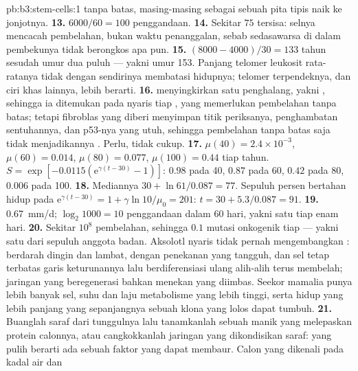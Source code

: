 \begin{solution}{pb:b3:stem-cells:1}
tanpa batas, masing-masing sebagai sebuah pita tipis naik ke jonjotnya.
\textbf{13.} $6000/60 = 100$ penggandaan.
\textbf{14.} Sekitar $75$ tersisa: selnya mencacah pembelahan, bukan waktu
penanggalan, sebab sedasawarsa di dalam pembekunya tidak berongkos apa pun.
\textbf{15.} $(8000 - 4000)/30 = 133$ tahun sesudah umur dua puluh --- yakni umur 153.
Panjang telomer leukosit rata-ratanya tidak dengan sendirinya membatasi hidupnya;
telomer terpendeknya, dan ciri khas lainnya, lebih berarti.
\textbf{16.}  menyingkirkan satu penghalang, yakni ,
sehingga ia ditemukan pada nyaris tiap , yang memerlukan pembelahan
tanpa batas; tetapi fibroblas yang diberi  menyimpan titik periksanya,
penghambatan sentuhannya, dan p53-nya yang utuh, sehingga pembelahan tanpa batas saja tidak
menjadikannya . Perlu, tidak cukup.
\textbf{17.} $\mu(40) = 2.4\times 10^{-3}$, $\mu(60) = 0.014$, $\mu(80) =
0.077$, $\mu(100) = 0.44$ tiap tahun. $S = \exp[-0.0115(\mathrm{e}^{\gamma
(t-30)} - 1)]$: $0.98$ pada 40, $0.87$ pada 60, $0.42$ pada 80, $0.006$ pada
100.
\textbf{18.} Mediannya $30 + \ln 61/0.087 = 77$. Sepuluh persen bertahan hidup pada
$\mathrm{e}^{\gamma(t-30)} = 1 + \gamma\ln 10/\mu_{0} = 201$: $t = 30 +
5.3/0.087 = 91$.
\textbf{19.} \qty{0.67}{mm/d}; $\log_{2}1000 = 10$ penggandaan dalam 60
hari, yakni satu tiap enam hari.
\textbf{20.} Sekitar $10^{8}$ pembelahan, sehingga $0.1$ mutasi onkogenik tiap
 --- yakni satu dari sepuluh anggota badan. Aksolotl nyaris tidak pernah
mengembangkan : berdarah dingin dan lambat, dengan penekanan  yang tangguh, dan
sel  tetap terbatas garis keturunannya lalu berdiferensiasi ulang alih-alih
terus membelah; jaringan yang beregenerasi bahkan menekan 
yang diimbas. Seekor mamalia punya lebih banyak sel, suhu dan laju metabolisme
yang lebih tinggi, serta hidup yang lebih panjang yang sepanjangnya sebuah klona yang lolos dapat tumbuh.
\textbf{21.} Buanglah saraf dari tunggulnya lalu tanamkanlah sebuah manik yang melepaskan
protein calonnya, atau cangkokkanlah jaringan yang dikondisikan saraf: 
yang pulih berarti ada sebuah faktor yang dapat membaur. Calon yang dikenali pada kadal air dan

\end{solution}
